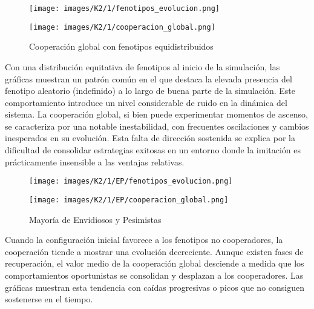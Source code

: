 \documentclass[a4paper,12pt]{report}
\begin{document}
\begin{figure}[h!]
    \centering
    \begin{minipage}{0.49\textwidth}
    \centering
    \texttt{[image: images/K2/1/fenotipos\_evolucion.png]}
    \label{fig:enter-label}
    \end{minipage}
    \hfill
    \begin{minipage}{0.49\textwidth}
    \centering
    \texttt{[image: images/K2/1/cooperacion\_global.png]}
    \label{fig:enter-label}
    \end{minipage}
    \caption{Cooperación global con fenotipos equidistribuidos}
\end{figure}
Con una distribución equitativa de fenotipos al inicio de la simulación, las gráficas muestran un patrón común en el que destaca la elevada presencia del fenotipo aleatorio (indefinido) a lo largo de buena parte de la simulación. Este comportamiento introduce un nivel considerable de ruido en la dinámica del sistema. La cooperación global, si bien puede experimentar momentos de ascenso, se caracteriza por una notable inestabilidad, con frecuentes oscilaciones y cambios inesperados en su evolución. Esta falta de dirección sostenida se explica por la dificultad de consolidar estrategias exitosas en un entorno donde la imitación es prácticamente insensible a las ventajas relativas.

\newpage

\begin{figure}[h]
    \centering
    \begin{minipage}{0.49\textwidth}
    \centering
    \texttt{[image: images/K2/1/EP/fenotipos\_evolucion.png]}
    \label{fig:enter-label}
    \end{minipage}
    \hfill
    \begin{minipage}{0.49\textwidth}
    \centering
    \texttt{[image: images/K2/1/EP/cooperacion\_global.png]}
    \label{fig:enter-label}
    \end{minipage}
    \caption{Mayoría de Envidiosos y Pesimistas}
\end{figure}

Cuando la configuración inicial favorece a los fenotipos no cooperadores, la cooperación tiende a mostrar una evolución decreciente. Aunque existen fases de recuperación, el valor medio de la cooperación global desciende a medida que los comportamientos oportunistas se consolidan y desplazan a los cooperadores. Las gráficas muestran esta tendencia con caídas progresivas o picos que no consiguen sostenerse en el tiempo.
\end{document}
